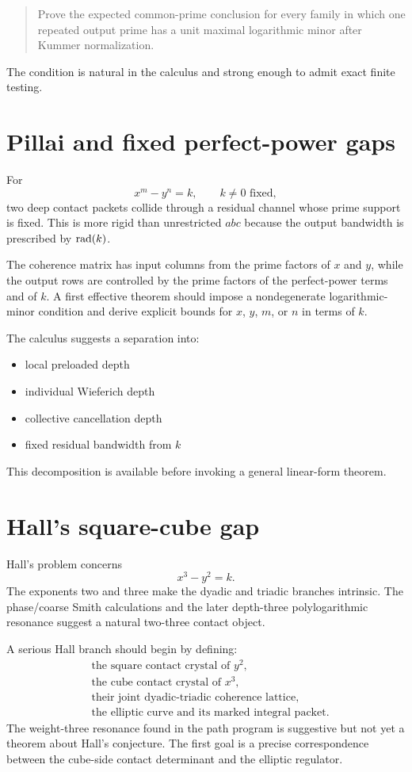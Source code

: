 \begin{quote}
Prove the expected common-prime conclusion for every family in which one repeated output prime has a unit maximal logarithmic minor after Kummer normalization.
\end{quote}

The condition is natural in the calculus and strong enough to admit exact finite testing.

\section{Pillai and fixed perfect-power gaps}
For
\[
x^m-y^n=k,
\qquad
k\ne0\text{ fixed},
\]
two deep contact packets collide through a residual channel whose prime support is fixed. This is more rigid than unrestricted $abc$ because the output bandwidth is prescribed by $\operatorname{rad}(k)$.

The coherence matrix has input columns from the prime factors of $x$ and $y$, while the output rows are controlled by the prime factors of the perfect-power terms and of $k$. A first effective theorem should impose a nondegenerate logarithmic-minor condition and derive explicit bounds for $x$, $y$, $m$, or $n$ in terms of $k$.

The calculus suggests a separation into:
\begin{itemize}[leftmargin=1.5em]
\item local preloaded depth
\item individual Wieferich depth
\item collective cancellation depth
\item fixed residual bandwidth from $k$
\end{itemize}
This decomposition is available before invoking a general linear-form theorem.

\section{Hall's square-cube gap}
Hall's problem concerns
\[
x^3-y^2=k.
\]
The exponents two and three make the dyadic and triadic branches intrinsic. The phase/coarse Smith calculations and the later depth-three polylogarithmic resonance suggest a natural two-three contact object.

A serious Hall branch should begin by defining:
\[
\begin{aligned}
&\text{the square contact crystal of }y^2,\\
&\text{the cube contact crystal of }x^3,\\
&\text{their joint dyadic-triadic coherence lattice},\\
&\text{the elliptic curve and its marked integral packet}.
\end{aligned}
\]
The weight-three resonance found in the path program is suggestive but not yet a theorem about Hall's conjecture. The first goal is a precise correspondence between the cube-side contact determinant and the elliptic regulator.

